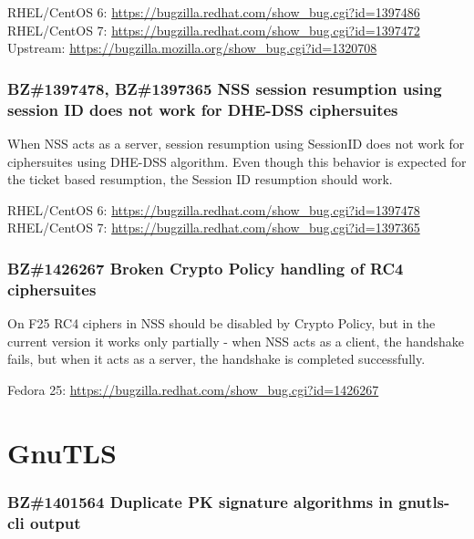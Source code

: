     \medskip\noindent RHEL/CentOS 6: \url{https://bugzilla.redhat.com/show_bug.cgi?id=1397486}
    \newline\noindent RHEL/CentOS 7: \url{https://bugzilla.redhat.com/show_bug.cgi?id=1397472}
    \newline\noindent Upstream: \url{https://bugzilla.mozilla.org/show_bug.cgi?id=1320708}

\subsubsection*{BZ\#1397478, BZ\#1397365  \newline
    NSS session resumption using session ID does not work for DHE-DSS ciphersuites}

    When NSS acts as a server, session resumption using SessionID does not work
    for ciphersuites using DHE-DSS algorithm. Even though this behavior is
    expected for the ticket based resumption, the Session ID resumption should work.

    \medskip\noindent RHEL/CentOS 6: \url{https://bugzilla.redhat.com/show_bug.cgi?id=1397478}
    \newline\noindent RHEL/CentOS 7: \url{https://bugzilla.redhat.com/show_bug.cgi?id=1397365}

\subsubsection*{BZ\#1426267  \newline
    Broken Crypto Policy handling of RC4 ciphersuites}

    On F25 RC4 ciphers in NSS should be disabled by Crypto Policy, but in the
    current version it works only partially - when NSS acts as a client,
    the handshake fails, but when it acts as a server, the handshake is
    completed successfully.

    \medskip\noindent Fedora 25: \url{https://bugzilla.redhat.com/show_bug.cgi?id=1426267}

\section{GnuTLS}
\subsubsection*{BZ\#1401564  \newline
    Duplicate PK signature algorithms in gnutls-cli output}

